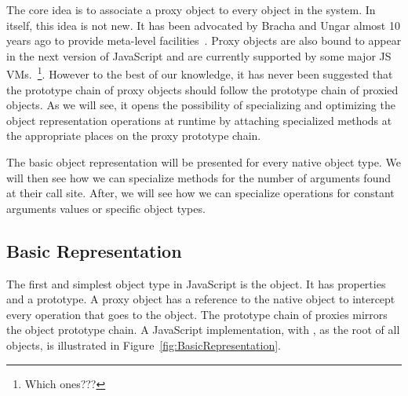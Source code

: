 The core idea is to associate a proxy object to every object in the system. In
itself, this idea is not new. It has been advocated by Bracha and Ungar almost
10 years ago to provide meta-level facilities~\cite{Bracha:2004vp}. Proxy
objects are also bound to appear in the next version of JavaScript and are
currently supported by some major JS VMs.~\footnote{Which ones???}. However to
the best of our knowledge, it has never been suggested that the prototype chain
of proxy objects should follow the prototype chain of proxied objects. As we
will see, it opens the possibility of specializing and optimizing the object
representation operations at runtime by attaching specialized methods at the
appropriate places on the proxy prototype chain.

The basic object representation will be presented for every native object type. We
will then see how we can specialize methods for the number of arguments found
at their call site.  After, we will see how we can specialize operations for
constant arguments values or specific object types.

\subsection{Basic Representation}

The first and simplest object type in JavaScript is the object. It has
properties and a prototype. A proxy object has a reference to the native object
to intercept every operation that goes to the object. The prototype chain of
proxies mirrors the object prototype chain. A JavaScript implementation, with
, as the root of all objects, is illustrated in
Figure~\ref{fig:BasicRepresentation}.

